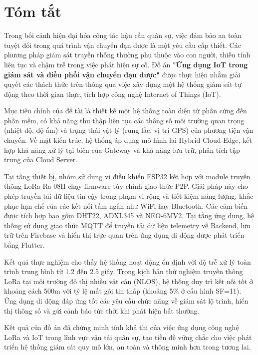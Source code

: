 \chapter*{Tóm tắt}
Trong bối cảnh hiện đại hóa công tác hậu cần quân sự, việc đảm bảo an toàn tuyệt đối trong quá trình vận chuyển đạn dược là một yêu cầu cấp thiết. Các phương pháp giám sát truyền thống thường phụ thuộc vào con người, thiếu tính liên tục và chậm trễ trong việc phát hiện sự cố. Đồ án \textbf{"Ứng dụng IoT trong giám sát và điều phối vận chuyển đạn dược"} được thực hiện nhằm giải quyết các thách thức trên thông qua việc xây dựng một hệ thống giám sát tự động theo thời gian thực, tích hợp công nghệ Internet of Things (IoT).

Mục tiêu chính của đề tài là thiết kế một hệ thống toàn diện từ phần cứng đến phần mềm, có khả năng thu thập liên tục các thông số môi trường quan trọng (nhiệt độ, độ ẩm) và trạng thái vật lý (rung lắc, vị trí GPS) của phương tiện vận chuyển. Về mặt kiến trúc, hệ thống áp dụng mô hình lai Hybrid Cloud-Edge, kết hợp khả năng xử lý tại biên của Gateway và khả năng lưu trữ, phân tích tập trung của Cloud Server.

Tại tầng thiết bị, nhóm sử dụng vi điều khiển ESP32 kết hợp với module truyền thông LoRa Ra-08H chạy firmware tùy chỉnh giao thức P2P. Giải pháp này cho phép truyền tải dữ liệu tin cậy trong phạm vi rộng và tiết kiệm năng lượng, khắc phục hạn chế của các kết nối tầm ngắn như WiFi hay Bluetooth. Các cảm biến được tích hợp bao gồm DHT22, ADXL345 và NEO-6MV2. Tại tầng ứng dụng, hệ thống sử dụng giao thức MQTT để truyền tải dữ liệu telemetry về Backend, lưu trữ trên Firebase và hiển thị trực quan trên ứng dụng di động được phát triển bằng Flutter.

Kết quả thực nghiệm cho thấy hệ thống hoạt động ổn định với độ trễ xử lý toàn trình trung bình từ 1.2 đến 2.5 giây. Trong kịch bản thử nghiệm truyền thông LoRa tại môi trường đô thị nhiều vật cản (NLOS), hệ thống duy trì kết nối tốt ở khoảng cách 500m với tỷ lệ mất gói tin thấp (khoảng 5\% ở cấu hình SF=11). Ứng dụng di động đáp ứng tốt các yêu cầu chức năng về giám sát lộ trình, hiển thị thông số và gửi cảnh báo tức thời khi phát hiện bất thường.

Kết quả của đồ án đã chứng minh tính khả thi của việc ứng dụng công nghệ LoRa và IoT trong lĩnh vực vận tải quân sự, tạo tiền đề vững chắc cho việc phát triển hệ thống giám sát quy mô lớn, an toàn và thông minh hơn trong tương lai.